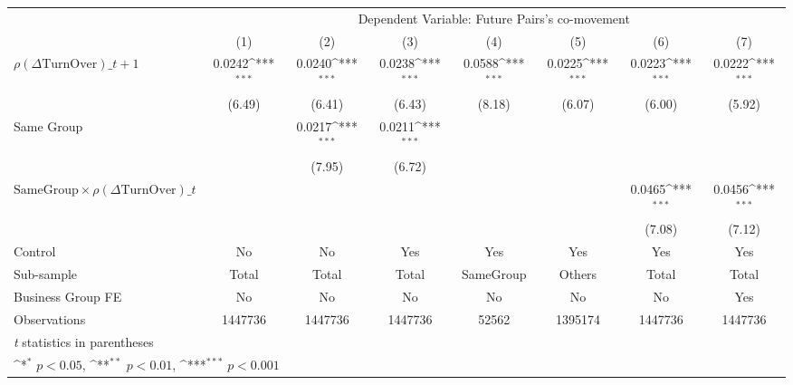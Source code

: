 {
\def\sym#1{\ifmmode^{#1}\else\(^{#1}\)\fi}
\begin{tabular}{l*{7}{c}}
\hline\hline
                &\multicolumn{7}{c}{Dependent Variable: Future Pairs's co-movement}                                                                  \\\cmidrule(lr){2-8}
                &\multicolumn{1}{c}{(1)}         &\multicolumn{1}{c}{(2)}         &\multicolumn{1}{c}{(3)}         &\multicolumn{1}{c}{(4)}         &\multicolumn{1}{c}{(5)}         &\multicolumn{1}{c}{(6)}         &\multicolumn{1}{c}{(7)}         \\
\hline
 $ {\rho(\Delta \text{TurnOver})\_{t+1}} $ &   0.0242\sym{***}&   0.0240\sym{***}&   0.0238\sym{***}&   0.0588\sym{***}&   0.0225\sym{***}&   0.0223\sym{***}&   0.0222\sym{***}\\
                &   (6.49)         &   (6.41)         &   (6.43)         &   (8.18)         &   (6.07)         &   (6.00)         &   (5.92)         \\
[1em]
Same Group      &                  &   0.0217\sym{***}&   0.0211\sym{***}&                  &                  &                  &                  \\
                &                  &   (7.95)         &   (6.72)         &                  &                  &                  &                  \\
[1em]
 $ \text{SameGroup} \times {\rho(\Delta \text{TurnOver})\_t} $ &                  &                  &                  &                  &                  &   0.0465\sym{***}&   0.0456\sym{***}\\
                &                  &                  &                  &                  &                  &   (7.08)         &   (7.12)         \\
\hline
Control         &       No         &       No         &      Yes         &      Yes         &      Yes         &      Yes         &      Yes         \\
Sub-sample      &    Total         &    Total         &    Total         &SameGroup         &   Others         &    Total         &    Total         \\
Business Group FE&       No         &       No         &       No         &       No         &       No         &       No         &      Yes         \\
Observations    &  1447736         &  1447736         &  1447736         &    52562         &  1395174         &  1447736         &  1447736         \\
\hline\hline
\multicolumn{8}{l}{\footnotesize \textit{t} statistics in parentheses}\\
\multicolumn{8}{l}{\footnotesize \sym{*} \(p<0.05\), \sym{**} \(p<0.01\), \sym{***} \(p<0.001\)}\\
\end{tabular}
}
